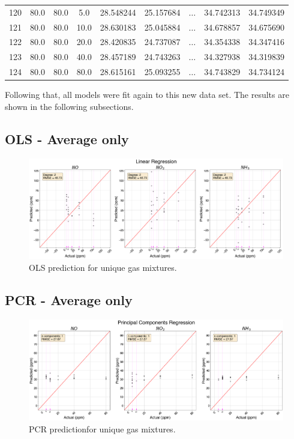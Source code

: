 \begin{table}
{\begin{tabular}{ccccp{2cm}p{2cm}p{0.3cm}p{2cm}p{2cm}}
		 120&80.0 &  80.0 &   5.0 &     28.548244 &     25.157684 &$\dots$&         34.742313 &         34.749349 \\
		121&80.0 &  80.0 &  10.0 &     28.630183 &     25.045884 &$\dots$&         34.678857 &         34.675690 \\
		122&80.0 &  80.0 &  20.0 &     28.420835 &     24.737087 &$\dots$&         34.354338 &         34.347416 \\
		123&80.0 &  80.0 &  40.0 &     28.457189 &     24.743263 &$\dots$&         34.327938 &         34.319839 \\
		124&80.0 &  80.0 &  80.0 &     28.615161 &     25.093255 &$\dots$&         34.743829 &         34.734124 \\
		\bottomrule[0.5mm]
	\end{tabular}}
\end{table}

Following that, all models were fit again to this new data set. The results are shown in the following subsections.

\newpage
\subsection{OLS - Average only}

\begin{figure}[h]
	\centering
	\includegraphics[width=1\textwidth]{../figures/ols-avg-only.png}
	\caption{OLS prediction for unique gas mixtures.}
	\label{fig:ols-avg-only}
\end{figure}

\newpage
\subsection{PCR - Average only}

\begin{figure}[h]
	\centering
	\includegraphics[width=1\textwidth]{../figures/pcr-avg-only.png}
	\caption{PCR predictionfor unique gas mixtures.}
	\label{fig:pcr-avg-only}
\end{figure}

